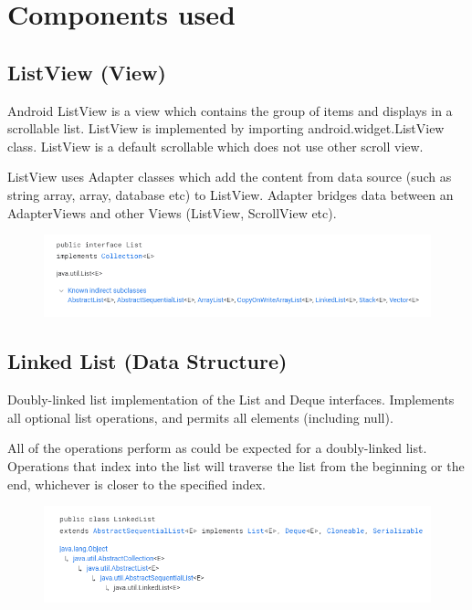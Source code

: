 \documentclass[11pt,a4paper]{report}
\begin{document}
 \chapter{Components used}

\section{ListView (View)}
\vskip 0.5cm
Android ListView is a view which contains the group of items and displays in a scrollable list. ListView is implemented by importing android.widget.ListView class. 
ListView is a default scrollable which does not use other scroll view.

ListView uses Adapter classes which add the content from data source (such as string array, array, database etc) to ListView. Adapter
 bridges data between an AdapterViews and other Views (ListView, ScrollView etc).

\begin{figure}[H]
	\centering
	\includegraphics[scale=0.75]{./img/Screenshot (146).png}
\end{figure}


\section{Linked List (Data Structure)}
Doubly-linked list implementation of the List and Deque interfaces. Implements all optional list operations, and permits all elements (including null).

All of the operations perform as could be expected for a doubly-linked list. Operations that index into the list will traverse the list from the beginning or the end, whichever is closer to the specified index.
	\begin{figure}[H]
		\centering
    \includegraphics[scale=0.75]{./img/Screenshot (145).png}
  
	\end{figure}
\end{document}
